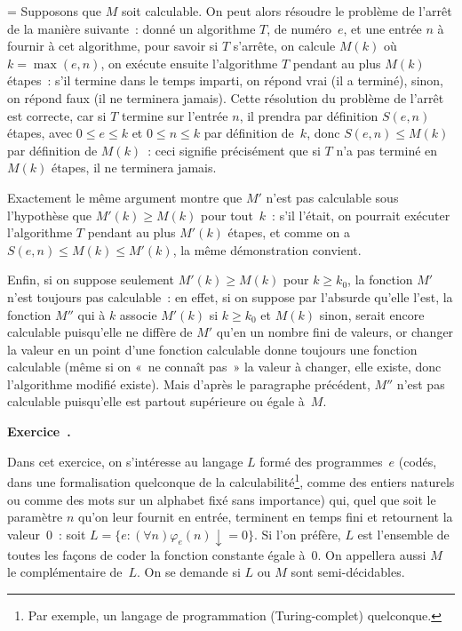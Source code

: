 \documentclass[12pt,a4paper]{article}
\theoremstyle{definition}
\newcommand\exercice{%
\refstepcounter{comcnt}\bigskip\noindent\textbf{Exercice~\thecomcnt.}}
\newif\ifcorrige
\newenvironment{corrige}%
{\ifcorrige\relax\else\setbox0=\vbox\bgroup\fi%
\smallbreak\footnotesize\noindent{\underbar{\textit{Corrigé.}}\quad}}
{{\hbox{}\nobreak\hfill\checkmark}%
\ifcorrige\relax\else\egroup\fi\par}
\begin{document}
\begin{corrige}
Supposons que $M$ soit calculable.  On peut alors résoudre le problème
de l'arrêt de la manière suivante : donné un algorithme $T$, de
numéro $e$, et une entrée $n$ à fournir à cet algorithme, pour savoir
si $T$ s'arrête, on calcule $M(k)$ où $k = \max(e,n)$, on exécute
ensuite l'algorithme $T$ pendant au plus $M(k)$ étapes : s'il termine
dans le temps imparti, on répond vrai (il a terminé), sinon, on répond
faux (il ne terminera jamais).  Cette résolution du problème de
l'arrêt est correcte, car si $T$ termine sur l'entrée $n$, il prendra
par définition $S(e,n)$ étapes, avec $0\leq e\leq k$ et $0\leq n\leq
k$ par définition de $k$, donc $S(e,n) \leq M(k)$ par définition de
$M(k)$ : ceci signifie précisément que si $T$ n'a pas terminé en
$M(k)$ étapes, il ne terminera jamais.

Exactement le même argument montre que $M'$ n'est pas calculable sous
l'hypothèse que $M'(k) \geq M(k)$ pour tout $k$ : s'il l'était, on
pourrait exécuter l'algorithme $T$ pendant au plus $M'(k)$ étapes, et
comme on a $S(e,n) \leq M(k) \leq M'(k)$, la même démonstration
convient.

Enfin, si on suppose seulement $M'(k)\geq M(k)$ pour $k\geq k_0$, la
fonction $M'$ n'est toujours pas calculable : en effet, si on suppose
par l'absurde qu'elle l'est, la fonction $M''$ qui à $k$ associe
$M'(k)$ si $k\geq k_0$ et $M(k)$ sinon, serait encore calculable
puisqu'elle ne diffère de $M'$ qu'en un nombre fini de valeurs, or
changer la valeur en un point d'une fonction calculable donne toujours
une fonction calculable (même si on « ne connaît pas » la valeur à
changer, elle existe, donc l'algorithme modifié existe).  Mais d'après
le paragraphe précédent, $M''$ n'est pas calculable puisqu'elle est
partout supérieure ou égale à $M$.
\end{corrige}

%

\exercice

Dans cet exercice, on s'intéresse au langage $L$ formé des
programmes $e$ (codés, dans une formalisation quelconque de la
calculabilité\footnote{Par exemple, un langage de programmation
  (Turing-complet) quelconque.}, comme des entiers naturels ou comme
des mots sur un alphabet fixé sans importance) qui, quel que soit le
paramètre $n$ qu'on leur fournit en entrée, terminent en temps fini et
retournent la valeur $0$ : soit $L = \{e : (\forall n)
{\varphi_e(n)\downarrow} = 0\}$.  Si l'on préfère, $L$ est l'ensemble
de toutes les façons de coder la fonction constante égale à $0$.  On
appellera aussi $M$ le complémentaire de $L$.  On se demande si $L$ ou
$M$ sont semi-décidables.
\end{document}
